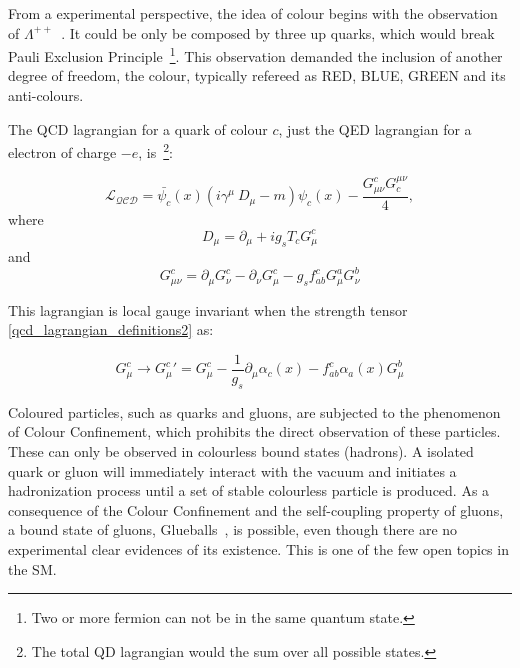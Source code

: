 From a experimental perspective, the idea of colour begins with the observation of $\Lambda^{++}$~\cite{dalitz1967proceedings}. It could be only be composed by three up quarks, which would break Pauli Exclusion Principle~\footnote{Two or more fermion can not be in the same quantum state.}. This observation demanded the inclusion of another degree of freedom, the colour, typically refereed as RED, BLUE, GREEN and its anti-colours.

The QCD lagrangian for a quark of colour $c$, just the QED lagrangian for a electron of charge $-e$, is~\footnote{The total QD lagrangian would the sum over all possible states.}:

\begin{equation}
    \mathcal{L_{QCD}} = \bar{\psi_c}(x)(i\gamma^\mu\ D_\mu -m)\psi_c(x) - \frac{G_{\mu\nu}^c G^{\mu\nu}_c}{4},
\label{qcd_lagrangian}
\end{equation}
where
\begin{equation}
    D_\mu = \partial_\mu + ig_s T_c G_\mu^c
\label{qcd_lagrangian_definitions1}
\end{equation}
and 
\begin{equation}
    G_{\mu\nu}^c = \partial_\mu G_\nu^c - \partial_\nu G_\mu^c - g_s f_{ab}^c G_\mu^a G_\nu^b
\label{qcd_lagrangian_definitions2}
\end{equation}

This lagrangian is local gauge invariant when the strength tensor \ref{qcd_lagrangian_definitions2} as:

\begin{equation}
    G_{\mu}^c \rightarrow {G_{\mu}^c}' = G_{\mu}^c - \frac{1}{g_s} \partial_\mu \alpha_c(x) - f_{ab}^c \alpha_a(x) G_{\mu}^b
\label{strength_tensor_tranform}
\end{equation}

Coloured particles, such as quarks and gluons, are subjected to the phenomenon of Colour Confinement, which prohibits the direct observation of these particles. These can only be observed in colourless bound states (hadrons). A isolated quark or gluon will immediately interact with the vacuum and initiates a hadronization process until a set of stable colourless particle is produced. As a consequence of the Colour Confinement and the self-coupling property of gluons, a bound state of gluons, Glueballs~\cite{wolfgang_status}, is possible, even though there are no experimental clear evidences of its existence. This is one of the few open topics in the SM.

